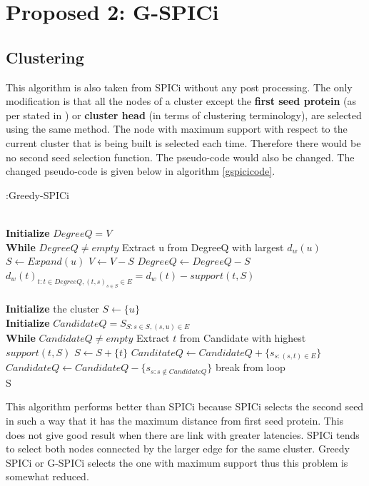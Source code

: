 \documentclass[10pt]{extarticle}
\begin{document}
	\section{Proposed 2: G-SPICi} \label{algo:gspici}
	
	\subsection{Clustering}
	This algorithm is  also taken from SPICi without any post processing. The only modification is that all the nodes of a cluster except the \textbf{first seed protein} (as per stated in \cite{spici}) or \textbf{cluster head} (in terms of clustering terminology), are selected using the same method. The node with maximum support with respect to the current cluster that is being built is selected each time. Therefore there would be no second seed selection function. The pseudo-code would also be changed. The changed pseudo-code is given below in algorithm \ref{gspicicode}.
	\begin{algorithm}
		\caption{:Greedy-SPICi}\label{gspicicode}
		\begin{algorithmic}[1]
			 \\
			\textbf{Initialize} $DegreeQ = V$ \\
			\textbf{While} $DegreeQ \neq empty$
			\State Extract u from DegreeQ with largest $d_w(u)$
			\State $S \gets Expand(u)$
			\State $V \gets V - S $
			\State $Degree Q \gets Degree Q - S$
			\State $d_w(t)_{t:t\in DegreeQ,(t,s)_{s\in S}\in E} = d_w(t) - support(t,S)$
			\EndProcedure\\
			\\
			\textbf{Initialize} the cluster $S \gets \{u\}$ \\
			\textbf{Initialize} $CandidateQ = S_{S:s\in S,(s,u)\in E}$\\
			\textbf{While} $CandidateQ \neq empty$
			\State Extract $t$ from Candidate with highest $support(t,S)$
			\State $S\gets S+\{t\}$
			\State $CanditateQ \gets CandidateQ + \{s_{s:(s,t)\in E}\}$
			\State $CandidateQ \gets CandidateQ - \{s_{s:s\not\in CandidateQ}\}$
			\Else
			\State break from loop
			\EndIf \\
			\Return S
			\EndProcedure
		\end{algorithmic}
	\end{algorithm}

	This algorithm performs better than SPICi because SPICi selects the second seed in such a way that it has the maximum distance from first seed protein. This does not give good result when there are link with greater latencies. SPICi tends to select both nodes connected by the larger edge for the same cluster. Greedy SPICi or G-SPICi selects the one with maximum support thus this problem is somewhat reduced.
	
\end{document}
